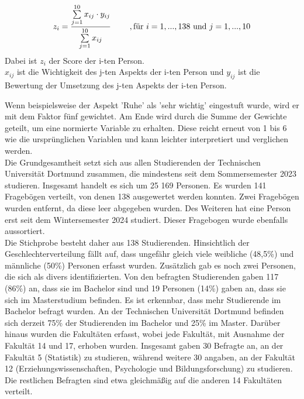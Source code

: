 \documentclass[11pt, a4paper]{article}
\begin{document}
\begin{equation*}
	z_i = \frac{\sum\limits_{j=1}^{10}x_{ij}\cdot  y_{ij}}{\sum\limits_{j=1}^{10}x_{ij}} \hspace{0.8cm} , \text{für} \ 
	i=1,...,138\  \text{und} \ j=1,...,10
\end{equation*} 
Dabei ist $z_i$ der Score der i-ten Person. \\
$x_{ij}$ ist die Wichtigkeit des j-ten Aspekts der i-ten Person und
$y_{ij}$ ist die Bewertung der Umsetzung des j-ten Aspekts der i-ten Person.

 Wenn beispielsweise der Aspekt 'Ruhe' als 'sehr wichtig' eingestuft wurde, wird er mit dem Faktor fünf gewichtet. Am Ende wird durch die Summe der Gewichte geteilt, um eine normierte Variable zu erhalten.  Diese reicht erneut von 1 bis 6 wie die ursprünglichen Variablen und kann leichter interpretiert und verglichen werden.\\


Die Grundgesamtheit setzt sich aus allen Studierenden der Technischen Universität Dortmund zusammen, die mindestens seit dem Sommersemester 2023 studieren. Insgesamt handelt es sich um 25 169 Personen. Es wurden 141 Fragebögen verteilt, von denen 138 ausgewertet werden konnten. Zwei Fragebögen wurden entfernt, da diese leer abgegeben wurden. Des Weiteren hat eine Person erst seit dem Wintersemester 2024 studiert. Dieser Fragebogen wurde ebenfalls aussortiert. \\


Die Stichprobe besteht daher aus 138 Studierenden. Hinsichtlich der Geschlechterverteilung fällt auf, dass ungefähr gleich viele weibliche (48,5\%) und männliche (50\%) Personen erfasst wurden. Zusätzlich gab es noch zwei Personen, die sich als divers identifizierten. Von den befragten Studierenden gaben 117 (86\%) an, dass sie im Bachelor sind und 19 Personen (14\%) gaben an, dass sie sich im Masterstudium befinden. Es ist erkennbar, dass mehr Studierende im Bachelor befragt wurden. An der Technischen Universität Dortmund befinden sich derzeit 75\% der Studierenden im Bachelor und 25\% im Master. Darüber hinaus wurden die Fakultäten erfasst, wobei jede Fakultät, mit Ausnahme der Fakultät 14 und 17, erhoben wurden. Insgesamt gaben 30 Befragte an, an der Fakultät 5 (Statistik) zu studieren, während weitere 30 angaben, an der Fakultät 12 (Erziehungswissenschaften, Psychologie und Bildungsforschung) zu studieren. Die restlichen Befragten sind etwa gleichmäßig auf die anderen 14 Fakultäten verteilt.
\end{document}
